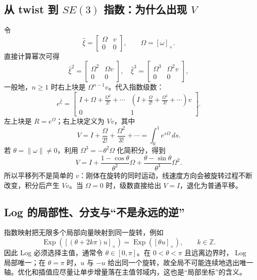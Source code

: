 \documentclass[UTF8,a4paper,11pt]{ctexart}
\newcommand{\Exp}{\operatorname{Exp}}
\newcommand{\Log}{\operatorname{Log}}
\newcommand{\hatmat}[1]{\left[#1\right]_{\times}}
\begin{document}
\subsection{从 twist 到 \texorpdfstring{$SE(3)$}{SE(3)} 指数：为什么出现 $V$}
令
\[
\hat\xi=\begin{bmatrix}\Omega&v\\0&0\end{bmatrix},\qquad \Omega=\hatmat{\omega}.
\]
直接计算幂次可得
\[
\hat\xi^2=\begin{bmatrix}\Omega^2&\Omega v\\0&0\end{bmatrix},\quad
\hat\xi^3=\begin{bmatrix}\Omega^3&\Omega^2v\\0&0\end{bmatrix},
\]
一般地，$n\ge1$ 时右上块是 $\Omega^{n-1}v$。代入指数级数：
\[
e^{\hat\xi}=\begin{bmatrix}
I+\Omega+\frac{\Omega^2}{2!}+\cdots &
\left(I+\frac{\Omega}{2!}+\frac{\Omega^2}{3!}+\cdots\right)v\\
0&1
\end{bmatrix}.
\]
左上块是 $R=e^\Omega$；右上块定义为 $Vv$，其中
\[
V=I+\frac{\Omega}{2!}+\frac{\Omega^2}{3!}+\cdots
=\int_0^1e^{s\Omega}\,ds.
\]
若 $\theta=\|\omega\|\ne0$，利用 $\Omega^3=-\theta^2\Omega$ 化简积分，得到
\[
V=I+\frac{1-\cos\theta}{\theta^2}\Omega+\frac{\theta-\sin\theta}{\theta^3}\Omega^2.
\]
所以平移列不是简单的 $v$：刚体在旋转的同时运动，线速度方向会被旋转过程不断改变，积分后产生 $Vv$。当 $\Omega=0$ 时，级数直接给出 $V=I$，退化为普通平移。

\subsection{Log 的局部性、分支与“不是永远的逆”}
指数映射把无限多个局部向量映射到同一旋转，例如
\[
\Exp(\hatmat{(\theta+2k\pi)u})=\Exp(\hatmat{\theta u}),\qquad k\in\mathbb Z.
\]
因此 Log 必须选择主值，通常令 $\theta\in[0,\pi]$。在 $0<\theta<\pi$ 且远离边界时，$\Log$ 局部唯一；在 $\theta=\pi$ 时，$u$ 与 $-u$ 给出同一个旋转，故全局不可能连续地选出唯一轴。优化和插值应尽量让单步增量落在主值邻域内，这也是“局部坐标”的含义。
\end{document}

